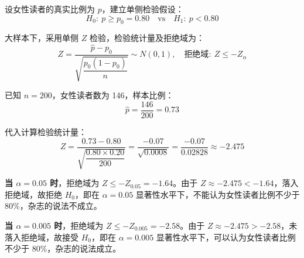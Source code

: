 \documentclass{article}
\begin{document}
设女性读者的真实比例为 $p$，建立单侧检验假设：
\[ H_0:\ p\geqslant p_0=0.80 \quad\text{vs}\quad H_1:\ p<0.80 \]

大样本下，采用单侧 $Z$ 检验，检验统计量及拒绝域为：
\[ Z=\dfrac{\hat{p}-p_0}{\displaystyle\sqrt{\dfrac{p_0(1-p_0)}{n}}}\sim N(0,1),\quad \text{拒绝域}:\ Z\leqslant-Z_{\alpha} \]

已知 $n=200$，女性读者数为 146，样本比例：
\[ \hat{p}=\dfrac{146}{200}=0.73 \]

代入计算检验统计量：
\[ Z=\dfrac{0.73-0.80}{\displaystyle\sqrt{\dfrac{0.80\times0.20}{200}}}=\dfrac{-0.07}{\displaystyle\sqrt{0.0008}}=\dfrac{-0.07}{0.02828}\approx-2.475 \]

\textbf{当 $\alpha=0.05$ 时}，拒绝域为 $Z\leqslant-Z_{0.05}=-1.64$。由于 $Z\approx-2.475<-1.64$，落入拒绝域，故拒绝 $H_0$，即在 $\alpha=0.05$ 显著性水平下，不能认为女性读者比例不少于 80\%，杂志的说法不成立。

\textbf{当 $\alpha=0.005$ 时}，拒绝域为 $Z\leqslant-Z_{0.005}=-2.58$。由于 $Z\approx-2.475>-2.58$，未落入拒绝域，故接受 $H_0$，即在 $\alpha=0.005$ 显著性水平下，可以认为女性读者比例不少于 80\%，杂志的说法成立。
\end{document}
